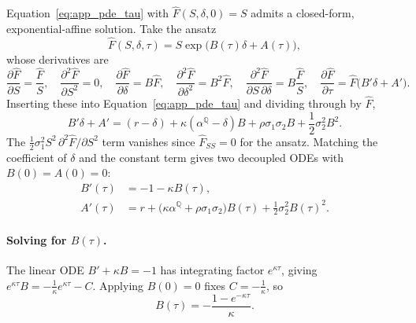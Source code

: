 \documentclass[11pt, a4paper]{article}
\newcommand{\convyield}{\delta}             %
\newcommand{\meanrev}{\kappa}               %
\newcommand{\longrun}{\alpha}               %
\begin{document}
Equation~\ref{eq:app_pde_tau} with $\hat{F}(S, \convyield, 0) = S$ admits a closed-form, exponential-affine solution. Take the ansatz
\begin{equation}
  \label{eq:app_ansatz}
  \hat{F}(S, \convyield, \tau) = S\exp\!\big(B(\tau)\convyield + A(\tau)\big),
\end{equation}
\noindent
whose derivatives are
\begin{equation}
  \label{eq:app_derivs}
  \frac{\partial \hat{F}}{\partial S} = \frac{\hat{F}}{S},
  \quad
  \frac{\partial^2 \hat{F}}{\partial S^2} = 0,
  \quad
  \frac{\partial \hat{F}}{\partial \convyield} = B\hat{F},
  \quad
  \frac{\partial^2 \hat{F}}{\partial \convyield^2} = B^2\hat{F},
  \quad
  \frac{\partial^2 \hat{F}}{\partial S\,\partial \convyield} = B\frac{\hat{F}}{S},
  \quad
  \frac{\partial \hat{F}}{\partial \tau} = \hat{F}\big(B'\convyield + A'\big).
\end{equation}
\noindent
Inserting these into Equation~\ref{eq:app_pde_tau} and dividing through by $\hat{F}$,
\begin{equation}
  \label{eq:app_substituted}
  B'\convyield + A'
  = (r - \convyield)
  + \meanrev(\longrun^{\mathbb{Q}} - \convyield)B
  + \rho\sigma_1\sigma_2 B
  + \frac{1}{2}\sigma_2^2 B^2.
\end{equation}
\noindent
The $\tfrac{1}{2}\sigma_1^2 S^2\,\partial^2\hat{F}/\partial S^2$ term vanishes since $\hat{F}_{SS} = 0$ for the ansatz. Matching the coefficient of $\convyield$ and the constant term gives two decoupled ODEs with $B(0) = A(0) = 0$:
\begin{align}
  \label{eq:app_ode_B}
  B'(\tau) &= -1 - \meanrev B(\tau), \\
  \label{eq:app_ode_A}
  A'(\tau) &= r + \big(\meanrev\longrun^{\mathbb{Q}} + \rho\sigma_1\sigma_2\big)B(\tau) + \frac{1}{2}\sigma_2^2 B(\tau)^2.
\end{align}

\paragraph{Solving for $B(\tau)$.} The linear ODE $B' + \meanrev B = -1$ has integrating factor $e^{\meanrev\tau}$, giving $e^{\meanrev\tau}B = -\tfrac{1}{\meanrev}e^{\meanrev\tau} - C$. Applying $B(0) = 0$ fixes $C = -\tfrac{1}{\meanrev}$, so
\begin{equation}
  \label{eq:app_B}
  B(\tau) = -\frac{1 - e^{-\meanrev\tau}}{\meanrev}.
\end{equation}
\end{document}
